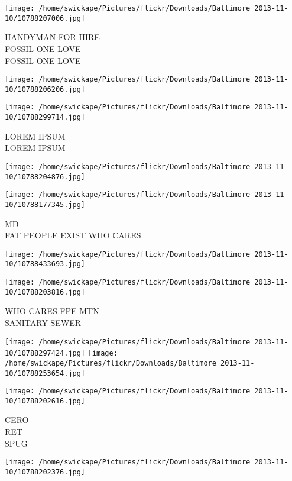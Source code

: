 \documentclass[10pt,letterpaper]{article}
\begin{document}
\texttt{[image: /home/swickape/Pictures/flickr/Downloads/Baltimore 2013-11-10/10788207006.jpg]}

HANDYMAN FOR HIRE\\
FOSSIL ONE LOVE\\
FOSSIL ONE LOVE
\pagebreak

\texttt{[image: /home/swickape/Pictures/flickr/Downloads/Baltimore 2013-11-10/10788206206.jpg]}

\vspace{0.25in}
\texttt{[image: /home/swickape/Pictures/flickr/Downloads/Baltimore 2013-11-10/10788299714.jpg]}

LOREM IPSUM\\
LOREM IPSUM
\pagebreak

\texttt{[image: /home/swickape/Pictures/flickr/Downloads/Baltimore 2013-11-10/10788204876.jpg]}

\vspace{0.25in}
\texttt{[image: /home/swickape/Pictures/flickr/Downloads/Baltimore 2013-11-10/10788177345.jpg]}

MD\\
FAT PEOPLE EXIST WHO CARES
\pagebreak

\texttt{[image: /home/swickape/Pictures/flickr/Downloads/Baltimore 2013-11-10/10788433693.jpg]}

\vspace{0.25in}
\texttt{[image: /home/swickape/Pictures/flickr/Downloads/Baltimore 2013-11-10/10788203816.jpg]}

WHO CARES FPE MTN\\
SANITARY SEWER
\pagebreak

\texttt{[image: /home/swickape/Pictures/flickr/Downloads/Baltimore 2013-11-10/10788297424.jpg]}
\texttt{[image: /home/swickape/Pictures/flickr/Downloads/Baltimore 2013-11-10/10788253654.jpg]}

\vspace{0.25in}
\texttt{[image: /home/swickape/Pictures/flickr/Downloads/Baltimore 2013-11-10/10788202616.jpg]}

CERO\\
RET\\
SPUG
\pagebreak

\texttt{[image: /home/swickape/Pictures/flickr/Downloads/Baltimore 2013-11-10/10788202376.jpg]}
\end{document}
